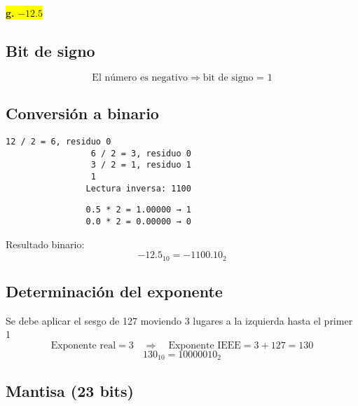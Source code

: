 \documentclass[a4paper,12pt]{article}
\begin{document}
			\begin{center}	
			\colorbox{yellow}{{\textbf{g.} $-12.5$}}
			
			\subsection*{Bit de signo}
			
			\[
			\text{El número es negativo} \Rightarrow \text{bit de signo = } \boxed{1}
			\]
			
			\subsection*{Conversión a binario}
			
			
	     \begin{center}
	     	\begin{Verbatim}[formatcom=\centering]
	     		12 / 2 = 6, residuo 0
	     		 6 / 2 = 3, residuo 0
	     		 3 / 2 = 1, residuo 1
	     		 1 
	     		Lectura inversa: 1100
	     	\end{Verbatim}
			\end{center}
			
			
			\begin{center}
		     \begin{Verbatim}
		     	0.5 * 2 = 1.00000 → 1 
		     	0.0 * 2 = 0.00000 → 0 
		     \end{Verbatim}
			\end{center}
			
			Resultado binario: 
			\[
			-12.5_{10} = -1100.10_2
			\]
			
			\subsection*{Determinación del exponente}
			
			Se debe aplicar el sesgo de 127 moviendo 3 lugares a la izquierda hasta el primer 1
			\vspace{-0.5em}
			\[
			\text{Exponente real} = 3 \quad \Rightarrow \quad \text{Exponente IEEE} = 3 + 127 = 130
			\]
			\vspace{-0.5em}
			\[
			130_{10} = 10000010_2
			\]
			
			\subsection*{Mantisa (23 bits)}
			

\end{center}
\end{document}
